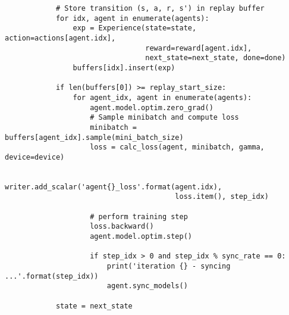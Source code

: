 \begin{appendices}
\begin{verbatim}
            # Store transition (s, a, r, s') in replay buffer
            for idx, agent in enumerate(agents):
                exp = Experience(state=state, action=actions[agent.idx],
                                 reward=reward[agent.idx],
                                 next_state=next_state, done=done)
                buffers[idx].insert(exp)

            if len(buffers[0]) >= replay_start_size:
                for agent_idx, agent in enumerate(agents):
                    agent.model.optim.zero_grad()
                    # Sample minibatch and compute loss
                    minibatch = buffers[agent_idx].sample(mini_batch_size)
                    loss = calc_loss(agent, minibatch, gamma, device=device)

                    writer.add_scalar('agent{}_loss'.format(agent.idx),
                                        loss.item(), step_idx)
                
                    # perform training step 
                    loss.backward()
                    agent.model.optim.step()

                    if step_idx > 0 and step_idx % sync_rate == 0:
                        print('iteration {} - syncing ...'.format(step_idx))
                        agent.sync_models()

            state = next_state


\end{verbatim}

\end{appendices}


